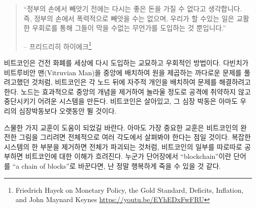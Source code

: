 \begin{quotation}\begin{samepage}
		\enquote{정부의 손에서 빼앗기 전에는 다시는 좋은 돈을 가질 수 없다고 생각합니다.
		즉, 정부의 손에서 폭력적으로 빼앗을 수는 없으며, 우리가 할 수있는 일은 교활한 우회로를 통해
		그들이 막을 수없는 무언가를 도입하는 것 뿐입니다.}
		\begin{flushright} -- 프리드리히 하이에크\footnote{Friedrich Hayek on Monetary Policy, the Gold Standard, Deficits, Inflation, and John Maynard Keynes \url{https://youtu.be/EYhEDxFwFRU}}
\end{flushright}\end{samepage}\end{quotation}

\begin{comment}
	Bitcoin is the sly, roundabout way to re-introduce good money to the world. It
	does so by placing a sovereign individual behind each node, just like Da Vinci
	tried to solve the intractable problem of squaring a circle by placing the
	Vitruvian Man in its center. Nodes effectively remove any concept of a center,
	creating a system which is astonishingly antifragile and extremely hard to shut
	down. Bitcoin lives, and its heartbeat will probably outlast all of ours.
\end{comment}
비트코인은 건전 화폐를 세상에 다시 도입하는 교묘하고 우회적인 방법이다.
다빈치가 비트루비안 맨(Vitruvian Man)을 중앙에 배치하여 원을 제곱하는 까다로운 문제를 풀려고했던 것처럼,
비트코인은 각 노드 뒤에 자주적 개인을 배치하여 문제를 해결하려고 한다.
노드는 효과적으로 중앙의 개념을 제거하여 놀라울 정도로 공격에 취약하지 않고 중단시키기 어려운 시스템을 만든다.
비트코인은 살아있고, 그 심장 박동은 아마도 우리의 심장박동보다 오랫동안 뛸 것이다.

\begin{comment}
	I hope you have enjoyed these twenty-one lessons. Maybe the most important
	lesson is that Bitcoin should be examined holistically, from multiple angles, if
	one would like to have something approximating a complete picture. Just like
	removing one part from a complex system destroys the whole, examining parts of
	Bitcoin in isolation seems to taint the understanding of it. If only one person
	strikes \enquote{blockchain} from her vocabulary and replaces it with \enquote{a
		chain of blocks} I will die a happy man.
\end{comment}
스물한 가지 교훈이 도움이 되었길 바란다. 
아마도 가장 중요한 교훈은 비트코인의 완전한 그림을 그리려면 전체적으로 여러 각도에서 살펴봐야 한다는 점일 것이다. 
복잡한 시스템의 한 부분을 제거하면 전체가 파괴되는 것처럼, 
비트코인의 일부를 따로따로 공부하면 비트코인에 대한 이해가 흐려진다.
누군가 단어장에서 \enquote{blockchain}이란 단어를 \enquote{a chain of blocks}로 바꾼다면, 난 정말 행복하게 죽을 수 있을 것 같다.

